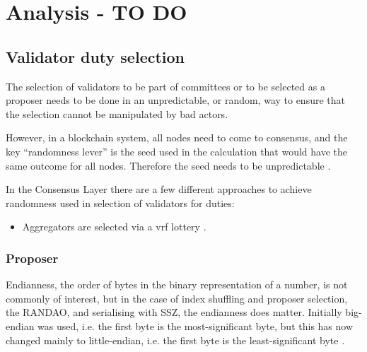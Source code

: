 \section{Analysis - TO DO}
\label{sec:analysis}
\subsection{Validator duty selection}
The selection of validators to be part of committees or to be selected as a proposer needs to be done in an unpredictable, or random, way to ensure that the selection cannot be manipulated by bad actors.

However, in a blockchain system, all nodes need to come to consensus, and the key ``randomness lever'' is the seed used in the  calculation that would have the same outcome for all nodes. Therefore the seed needs to be unpredictable \cite{buterin2020}.



In the Consensus Layer there are a few different approaches to achieve randomness used in selection of validators for duties:
\begin{itemize}
\item Aggregators are selected via a \gls{vrf} lottery \cite{Edgington2023}.
\end{itemize}


\subsubsection*{Proposer}
Endianness, the order of bytes in the binary representation of a number, is not commonly of interest, but in the case of index shuffling and proposer selection, the RANDAO, and serialising with SSZ, the endianness does matter. Initially big-endian was used, i.e. the first byte is the most-significant byte, but this has now changed mainly to little-endian, i.e. the first byte is the least-significant byte \cite{Edgington2023}.





